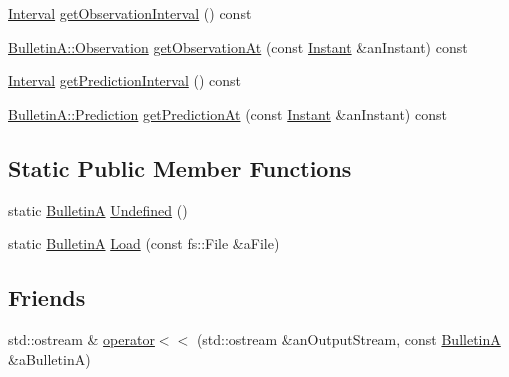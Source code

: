 \begin{DoxyCompactItemize}
\item 
\hyperlink{classlibrary_1_1physics_1_1time_1_1_interval}{Interval} \hyperlink{classlibrary_1_1physics_1_1coord_1_1frame_1_1provider_1_1iers_1_1_bulletin_a_a0247d07abbaec7888d2193a3a775e857}{get\+Observation\+Interval} () const
\item 
\hyperlink{structlibrary_1_1physics_1_1coord_1_1frame_1_1provider_1_1iers_1_1_bulletin_a_1_1_observation}{Bulletin\+A\+::\+Observation} \hyperlink{classlibrary_1_1physics_1_1coord_1_1frame_1_1provider_1_1iers_1_1_bulletin_a_acbe6d5cd2384b12d20d7b2785703df8d}{get\+Observation\+At} (const \hyperlink{classlibrary_1_1physics_1_1time_1_1_instant}{Instant} \&an\+Instant) const
\item 
\hyperlink{classlibrary_1_1physics_1_1time_1_1_interval}{Interval} \hyperlink{classlibrary_1_1physics_1_1coord_1_1frame_1_1provider_1_1iers_1_1_bulletin_a_a45e03c13ae141de584df7c184205338f}{get\+Prediction\+Interval} () const
\item 
\hyperlink{structlibrary_1_1physics_1_1coord_1_1frame_1_1provider_1_1iers_1_1_bulletin_a_1_1_prediction}{Bulletin\+A\+::\+Prediction} \hyperlink{classlibrary_1_1physics_1_1coord_1_1frame_1_1provider_1_1iers_1_1_bulletin_a_a915f6c004a2e65b60638590354ba4b0e}{get\+Prediction\+At} (const \hyperlink{classlibrary_1_1physics_1_1time_1_1_instant}{Instant} \&an\+Instant) const
\end{DoxyCompactItemize}
\subsection*{Static Public Member Functions}
\begin{DoxyCompactItemize}
\item 
static \hyperlink{classlibrary_1_1physics_1_1coord_1_1frame_1_1provider_1_1iers_1_1_bulletin_a}{BulletinA} \hyperlink{classlibrary_1_1physics_1_1coord_1_1frame_1_1provider_1_1iers_1_1_bulletin_a_a4ac08ec1e1695cab3c253b04a96df2bb}{Undefined} ()
\item 
static \hyperlink{classlibrary_1_1physics_1_1coord_1_1frame_1_1provider_1_1iers_1_1_bulletin_a}{BulletinA} \hyperlink{classlibrary_1_1physics_1_1coord_1_1frame_1_1provider_1_1iers_1_1_bulletin_a_ae261db430e297bd1e5db4bb96e0a23bf}{Load} (const fs\+::\+File \&a\+File)
\end{DoxyCompactItemize}
\subsection*{Friends}
\begin{DoxyCompactItemize}
\item 
std\+::ostream \& \hyperlink{classlibrary_1_1physics_1_1coord_1_1frame_1_1provider_1_1iers_1_1_bulletin_a_ad02d4bd47c889c76484ba4056cee01a4}{operator$<$$<$} (std\+::ostream \&an\+Output\+Stream, const \hyperlink{classlibrary_1_1physics_1_1coord_1_1frame_1_1provider_1_1iers_1_1_bulletin_a}{BulletinA} \&a\+BulletinA)
\end{DoxyCompactItemize}


